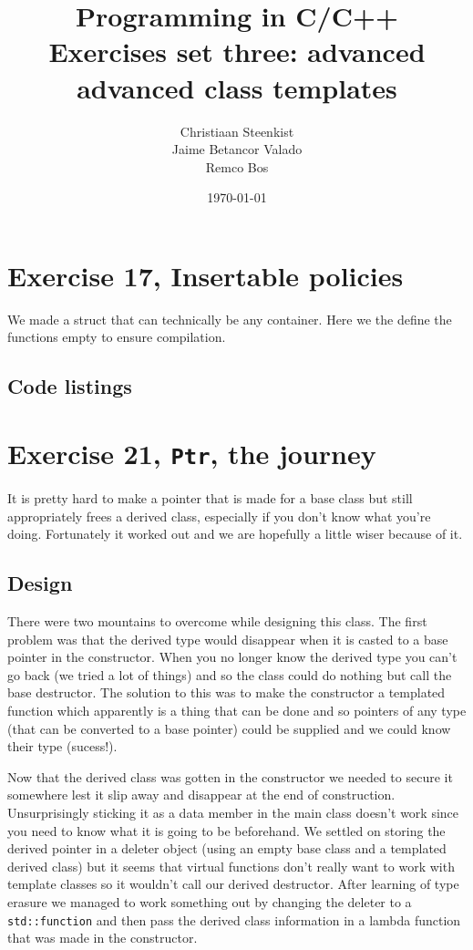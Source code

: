 \documentclass[11pt]{article}
\begin{document}
\title{Programming in C/C++ \\
       Exercises set three: advanced advanced class templates
}
\date{\today}
\author{Christiaan Steenkist \\
Jaime Betancor Valado \\
Remco Bos \\
}

\maketitle
\section*{Exercise 17, Insertable policies}
We made a struct that can technically be any container.
Here we the define the functions empty to ensure compilation.

\subsection*{Code listings}




\section*{Exercise 21, \texttt{Ptr}, the journey}
It is pretty hard to make a pointer that is made for a base class but still appropriately frees a derived class, especially if you don't know what you're doing. Fortunately it worked out and we are hopefully a little wiser because of it.

\subsection*{Design}
There were two mountains to overcome while designing this class.
The first problem was that the derived type would disappear when it is casted to a base pointer in the constructor.
When you no longer know the derived type you can't go back (we tried a lot of things) and so the class could do nothing but call the base destructor.
The solution to this was to make the constructor a templated function which apparently is a thing that can be done and so pointers of any type (that can be converted to a base pointer) could be supplied and we could know their type (sucess!).

Now that the derived class was gotten in the constructor we needed to secure it somewhere lest it slip away and disappear at the end of construction.
Unsurprisingly sticking it as a data member in the main class doesn't work since you need to know what it is going to be beforehand.
We settled on storing the derived pointer in a deleter object (using an empty base class and a templated derived class) but it seems that virtual functions don't really want to work with template classes so it wouldn't call our derived destructor.
After learning of type erasure we managed to work something out by changing the deleter to a \texttt{std::function} and then pass the derived class information in a lambda function that was made in the constructor.
\end{document}
